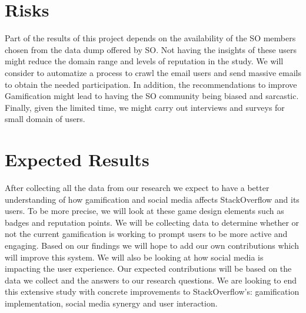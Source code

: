 \documentclass{sigchi}
\begin{document}
\section{Risks}

Part of the results of this project depends on the availability of the SO
members chosen from the data dump offered by SO. Not having the insights of
these users might reduce the domain range and levels of reputation in the
study. We will consider to automatize a process to crawl the email users and
send massive emails to obtain the needed participation. In addition, the
recommendations to improve Gamification might lead to having the SO community
being biased and sarcastic. Finally, given the limited time, we might carry out
interviews and surveys for small domain of users.


\section{Expected Results}

After collecting all the data from our research we expect to have a better
understanding of how gamification and social media affects StackOverflow and its
users. To be more precise, we will look at these game design elements such as
badges and reputation points. We will be collecting data to determine  whether
or not the current gamification is working to prompt users to be more active
and engaging. Based on our findings we will hope to add our own contributions
which will improve this system. We will also be looking at how social media is
impacting the user experience. Our expected contributions will be based on the
data we collect and the answers to our research questions. We are looking to
end this extensive study with concrete improvements to StackOverflow’s:
gamification implementation, social media synergy and user interaction.




% 
% 
\end{document}
